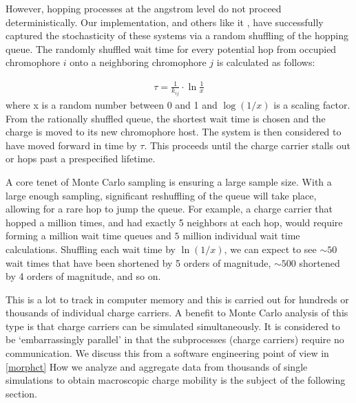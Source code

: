 However, hopping processes at the angstrom level do not proceed deterministically. 
Our implementation, and others like it \cite{Gali2017}\cite{Kaiser2018}, have
successfully captured the stochasticity of these systems via a random shuffling
of the hopping queue.
The randomly shuffled wait time for every potential hop from occupied chromophore $i$ onto a
neighboring chromophore $j$ is calculated as follows:

\begin{align}
    \tau = \frac{1}{k_{ij}} \cdot \ln{\frac{1}{x}} 
    \label{waittime}
\end{align}
where x is a random number between 0 and 1 and $\log{(1/x)}$ is a scaling
factor. From the rationally shuffled queue, the shortest wait time is chosen and the charge is moved to
its new chromophore host. The system is then considered to have moved forward in time by $\tau$. This proceeds
until the charge carrier stalls out or hops past a prespecified lifetime. 

A core tenet of Monte Carlo sampling is ensuring a large sample size.
With a large enough sampling, significant reshuffling of the queue will take place, 
allowing for a rare hop to jump the queue. 
For example, a charge carrier that hopped a million times, and had
exactly 5 neighbors at each hop, would require forming a million wait time
queues and $5$ million individual wait time calculations. Shuffling each wait
time by $\ln{(1/x)}$, we can expect to see ${\sim}50$ wait times that have been
shortened by 5 orders of magnitude, ${\sim}500$ shortened by 4 orders of magnitude, and so
on.

This is a lot to track in computer memory and this is carried out for hundreds
or thousands of individual charge carriers. 
A benefit to Monte Carlo analysis of this type is that charge carriers can be
simulated simultaneously. It is considered
to be `embarrassingly parallel' in that the subprocesses (charge carriers) require no communication.
We discuss this from a software engineering point of view in \autoref{morphct}
How we analyze and aggregate data from thousands of
single  simulations to obtain macroscopic charge mobility is the subject of the following section.

